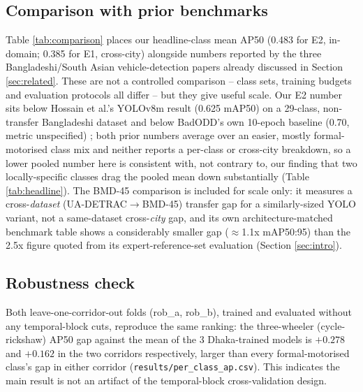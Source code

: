 \documentclass[conference,a4paper]{IEEEtran}
\begin{document}
\subsection{Comparison with prior benchmarks}

Table \ref{tab:comparison} places our headline-class mean AP50 (0.483 for E2,
in-domain; 0.385 for E1, cross-city) alongside numbers reported by the three
Bangladeshi/South Asian vehicle-detection papers already discussed in Section
\ref{sec:related}. These are not a controlled comparison -- class sets, training
budgets and evaluation protocols all differ -- but they give useful scale. Our E2
number sits below Hossain et al.'s YOLOv8m result (0.625 mAP50) on a 29-class,
non-transfer Bangladeshi dataset \cite{hossain2025yolobd} and below BadODD's own
10-epoch baseline (0.70, metric unspecified) \cite{baig2024badodd}; both prior numbers
average over an easier, mostly formal-motorised class mix and neither reports a
per-class or cross-city breakdown, so a lower pooled number here is consistent with,
not contrary to, our finding that two locally-specific classes drag the pooled mean
down substantially (Table \ref{tab:headline}). The BMD-45 comparison
\cite{sharma2026bmd45} is included for scale only: it measures a cross-\emph{dataset}
(UA-DETRAC$\to$BMD-45) transfer gap for a similarly-sized YOLO variant, not a
same-dataset cross-\emph{city} gap, and its own architecture-matched benchmark table
shows a considerably smaller gap ($\approx$1.1x mAP50:95) than the 2.5x figure quoted
from its expert-reference-set evaluation (Section \ref{sec:intro}).

\subsection{Robustness check}
Both leave-one-corridor-out folds (rob\_a, rob\_b), trained and evaluated without any
temporal-block cuts, reproduce the same ranking: the three-wheeler (cycle-rickshaw)
AP50 gap against the mean of the 3 Dhaka-trained models is $+0.278$ and $+0.162$ in the
two corridors respectively, larger than every formal-motorised class's gap in either
corridor (\texttt{results/per\_class\_ap.csv}). This indicates the main result is not
an artifact of the temporal-block cross-validation design.
\end{document}
